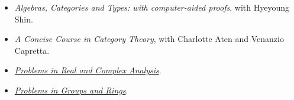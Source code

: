 \documentclass{article}
\begin{document}
    \begin{itemize}
      \item[] \textsl{Algebras, Categories and Types: with computer-aided proofs}, with Hyeyoung Shin.

     \item[] \textsl{A Concise Course in Category Theory}, with Charlotte Aten and Venanzio Capretta.


     \item[] \href{http://www.math.hawaii.edu/~williamdemeo/PSRCA.html}{\it Problems in Real and Complex Analysis}.

     \item[] \href{http://www.math.hawaii.edu/~williamdemeo/PSRCA.html}{\it Problems in Groups and Rings}.

   \end{itemize}








\end{document}
